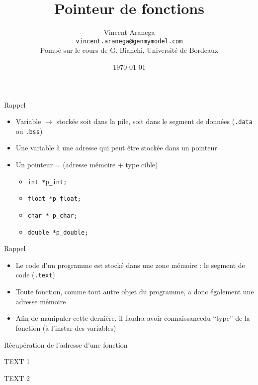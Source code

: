 \documentclass{beamer}
\title[Short Paper Title]{Pointeur de fonctions}
\author{Vincent Aranega\\%
\texttt{vincent.aranega@genmymodel.com}\\%
Pompé sur le cours de G. Bianchi, Université de Bordeaux}
\date{\today}
\begin{document}
  \maketitle

  \begin{frame}{Rappel}
    \begin{itemize}
      \item{Variable $\rightarrow$ stockée soit dans la pile, soit dans le segment de données (\texttt{.data} ou \texttt{.bss})}
      \item{Une variable à une adresse qui peut être stockée dans un pointeur}
      \item{Un pointeur = (adresse mémoire + type cible)}
      \begin{itemize}
        \item{\texttt{int *p\_int;}}
        \item{\texttt{float *p\_float;}}
        \item{\texttt{char * p\_char;}}
        \item{\texttt{double *p\_double;}}
      \end{itemize}
    \end{itemize}
  \end{frame}

  \begin{frame}{Rappel}
    \begin{itemize}
      \item{Le code d'un programme est stocké dans une zone mémoire : le segment de code (\texttt{.text})}
      \item{Toute fonction, comme tout autre objet du programme, a donc également une adresse mémoire}
      \item{Afin de manipuler cette dernière, il faudra avoir connaissancedu ``type'' de la fonction (à l’instar des variables)}
    \end{itemize}
  \end{frame}

  \begin{frame}{Récupération de l'adresse d'une fonction}
    \begin{minipage}{.5\textwidth}
      TEXT 1
    \end{minipage}%
    \begin{minipage}{.5\textwidth}
      TEXT 2
    \end{minipage}
  \end{frame}
\end{document}

